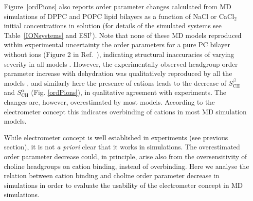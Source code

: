 \documentclass[twoside,twocolumn,9pt]{article}
\begin{document}
Figure~\ref{ordPions} also reports order parameter changes calculated from MD simulations
of DPPC and POPC lipid bilayers as a function of NaCl or CaCl$_2$ initial concentrations in solution
(for details of the simulated systems see Table~\ref{IONsystems} and ESI$^\dag$).
Note that none of these MD models
reproduced within experimental uncertainty the order parameters for a pure PC bilayer without ions
(Figure 2 in Ref.~),
indicating structural inaccuracies of varying severity in all models \cite{botan15}.
However, the experimentally observed headgroup order parameter increase with dehydration
was qualitatively reproduced by all the models \cite{botan15}, and 
similarly here the presence of cations leads to the decrease 
of $S_\mathrm{CH}^\beta$ and $S_\mathrm{CH}^\alpha$ (Fig. \ref{ordPions}), in qualitative
agreement with experiments. The changes are, however, overestimated by most models.
According to the electrometer concept this indicates overbinding of cations in most MD simulation
models.

While electrometer concept is well established in experiments (see previous section),
it is not {\it a priori} clear that it works in simulations. The overestimated order parameter
decrease could, in principle, arise also from the oversensitivity of choline headgroups on cation binding,
instead of overbinding. Here we analyse the relation between cation binding and choline order 
parameter decrease in simulations in order to evaluate the usability of the electrometer concept in MD simulations.
\end{document}
